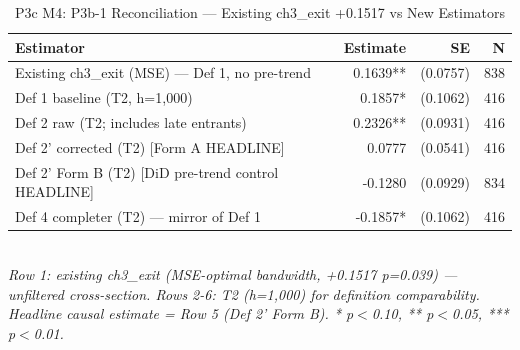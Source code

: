 \begin{table}[t]
\centering
\caption{P3c M4: P3b-1 Reconciliation — Existing ch3\_exit +0.1517 vs New Estimators}
\label{tab:ch5_reconciliation_en}
\begin{tabular}{p{6.5cm}rrr}
\toprule
Estimator & Estimate & SE & N \\
\midrule
Existing ch3_exit (MSE) — Def 1, no pre-trend & 0.1639** & (0.0757) & 838 \\
Def 1 baseline (T2, h=1,000) & 0.1857* & (0.1062) & 416 \\
Def 2 raw (T2; includes late entrants) & 0.2326** & (0.0931) & 416 \\
Def 2' corrected (T2) [Form A HEADLINE] & 0.0777 & (0.0541) & 416 \\
Def 2' Form B (T2) [DiD pre-trend control HEADLINE] & -0.1280 & (0.0929) & 834 \\
Def 4 completer (T2) — mirror of Def 1 & -0.1857* & (0.1062) & 416 \\
\bottomrule
\end{tabular}\\
\footnotesize\textit{Row 1: existing ch3\_exit (MSE-optimal bandwidth, +0.1517 p=0.039) — unfiltered cross-section. Rows 2-6: T2 (h=1,000) for definition comparability. Headline causal estimate = Row 5 (Def 2' Form B). * p$<$0.10, ** p$<$0.05, *** p$<$0.01.}
\end{table}

